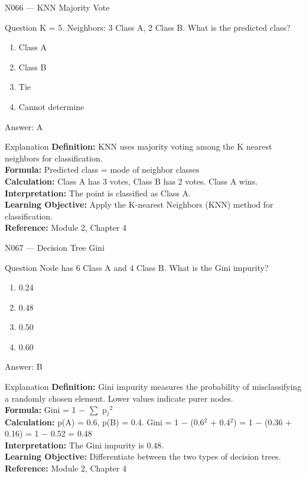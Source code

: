 \documentclass[aspectratio=169,8pt]{beamer}
\begin{document}
	\begin{frame}{N066 --- KNN Majority Vote}
		\begin{block}{Question}
			K = 5. Neighbors: 3 Class A, 2 Class B. What is the predicted class?
			\begin{enumerate}
				\item Class A
				\item Class B
				\item Tie
				\item Cannot determine
			\end{enumerate}
		\end{block}
		\begin{exampleblock}{Answer: A}\end{exampleblock}
		\begin{block}{Explanation}
			\textbf{Definition:} KNN uses majority voting among the K nearest neighbors for classification.\\
			\textbf{Formula:} Predicted class = mode of neighbor classes\\
			\textbf{Calculation:} Class A has 3 votes, Class B has 2 votes. Class A wins.\\
			\textbf{Interpretation:} The point is classified as Class A.\\
			\textbf{Learning Objective:} Apply the K-nearest Neighbors (KNN) method for classification.\\
			\textbf{Reference:} Module 2, Chapter 4
		\end{block}
	\end{frame}
	
	\begin{frame}{N067 --- Decision Tree Gini}
		\begin{block}{Question}
			Node has 6 Class A and 4 Class B. What is the Gini impurity?
			\begin{enumerate}
				\item 0.24
				\item 0.48
				\item 0.50
				\item 0.60
			\end{enumerate}
		\end{block}
		\begin{exampleblock}{Answer: B}\end{exampleblock}
		\begin{block}{Explanation}
			\textbf{Definition:} Gini impurity measures the probability of misclassifying a randomly chosen element. Lower values indicate purer nodes.\\
			\textbf{Formula:} Gini = 1 $-$ $\sum$ p$_{j}$$^{2}$\\
			\textbf{Calculation:} p(A) = 0.6, p(B) = 0.4. Gini = 1 $-$ (0.6$^{2}$ + 0.4$^{2}$) = 1 $-$ (0.36 + 0.16) = 1 $-$ 0.52 = 0.48\\
			\textbf{Interpretation:} The Gini impurity is 0.48.\\
			\textbf{Learning Objective:} Differentiate between the two types of decision trees.\\
			\textbf{Reference:} Module 2, Chapter 4
		\end{block}
	\end{frame}
	
\end{document}
